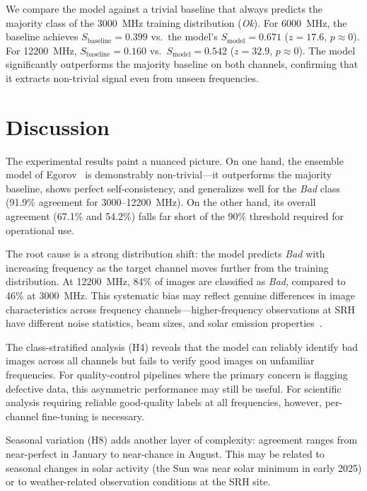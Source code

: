 \documentclass{article}
\theoremstyle{plain}
\theoremstyle{definition}
\begin{document}
We compare the model against a trivial baseline that always predicts
the majority class of the 3000~MHz training distribution (\emph{Ok}).
For 6000~MHz, the baseline achieves $S_{\text{baseline}} = 0.399$ vs.\
the model's $S_{\text{model}} = 0.671$ ($z = 17.6$, $p \approx 0$).
For 12200~MHz, $S_{\text{baseline}} = 0.160$ vs.\
$S_{\text{model}} = 0.542$ ($z = 32.9$, $p \approx 0$).  The model
significantly outperforms the majority baseline on both channels,
confirming that it extracts non-trivial signal even from unseen
frequencies.

\section{Discussion}
\label{sec:discussion}

The experimental results paint a nuanced picture.  On one hand, the
ensemble model of Egorov~\cite{egorov2025} is demonstrably
non-trivial---it outperforms the majority baseline, shows perfect
self-consistency, and generalizes well for the \emph{Bad} class
(91.9\% agreement for 3000--12200~MHz).  On the other hand, its overall
agreement (67.1\% and 54.2\%) falls far short of the 90\% threshold
required for operational use.

The root cause is a strong distribution shift: the model predicts
\emph{Bad} with increasing frequency as the target channel moves
further from the training distribution.  At 12200~MHz, 84\% of images
are classified as \emph{Bad}, compared to 46\% at 3000~MHz.  This
systematic bias may reflect genuine differences in image characteristics
across frequency channels---higher-frequency observations at SRH have
different noise statistics, beam sizes, and solar emission
properties~\cite{altyntsev2020}.

The class-stratified analysis (H4) reveals that the model can reliably
identify bad images across all channels but fails to verify good images
on unfamiliar frequencies.  For quality-control pipelines where the
primary concern is flagging defective data, this asymmetric performance
may still be useful.  For scientific analysis requiring reliable
good-quality labels at all frequencies, however, per-channel
fine-tuning is necessary.

Seasonal variation (H8) adds another layer of complexity: agreement
ranges from near-perfect in January to near-chance in August.  This may
be related to seasonal changes in solar activity (the Sun was near
solar minimum in early 2025) or to weather-related observation
conditions at the SRH site.
\end{document}
